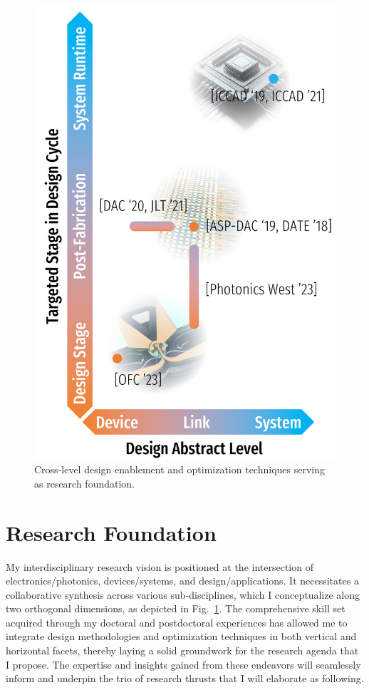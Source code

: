 \begin{figure}[!ht]%
    \includegraphics[width=\linewidth]{../../fig/research.pdf}
    \caption{Cross-level design enablement and optimization techniques serving as research foundation.}
    \label{fig:research}
\end{figure}
\section{Research Foundation}

My interdisciplinary research vision is positioned at the intersection of electronics/photonics, devices/systems, and design/applications. It necessitates a collaborative synthesis across various sub-disciplines, which I conceptualize along two orthogonal dimensions, as depicted in Fig.~\ref{fig:research}. The comprehensive skill set acquired through my doctoral and postdoctoral experiences has allowed me to integrate design methodologies and optimization techniques in both vertical and horizontal facets, thereby laying a solid groundwork for the research agenda that I propose. The expertise and insights gained from these endeavors will seamlessly inform and underpin the trio of research thrusts that I will elaborate as following.

